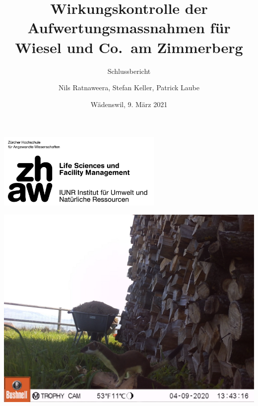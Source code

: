 \documentclass[
  oneside]{scrbook}
\title{Wirkungskontrolle der Aufwertungsmassnahmen für Wiesel und Co.~am Zimmerberg}
\subtitle{Schlussbericht}
\author{Nils Ratnaweera, Stefan Keller, Patrick Laube}
\date{Wädenswil, 9. März 2021}
\begin{document}
\maketitle


\makeatletter
\begin{titlepage}

\thispagestyle{empty}
\includegraphics[width=0.6\textwidth]{images/zhaw_lsfm_iunr_schwarz.jpg}

\begin{center}

\includegraphics{images/Hermelin_Str116_WK02.JPG}

\vspace{10pt}

{\huge \@title}

\vspace{30pt}

% 



\end{center}



\begin{flushleft}

\begin{minipage}{21cm}
\vspace{10cm}



\end{minipage}
\end{flushleft}
\end{titlepage}
\end{document}
